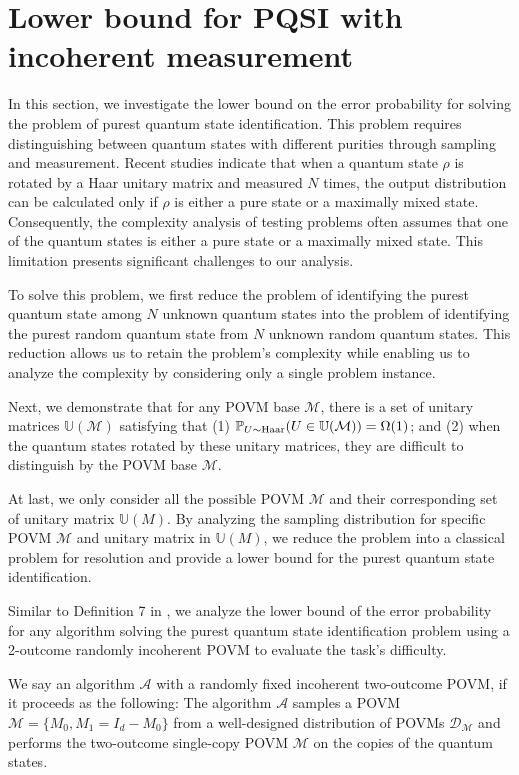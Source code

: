 \section{Lower bound for PQSI with incoherent measurement}
\label{sec: lower_bound}


In this section, we investigate the lower bound on the error probability for solving the problem of purest quantum state identification. This problem requires distinguishing between quantum states with different purities through sampling and measurement. Recent studies \cite{mele2024introduction} indicate that when a quantum state $\rho$ is rotated by a Haar unitary matrix and measured $N$ times, the output distribution can be calculated only if $\rho$ is either a pure state or a maximally mixed state. Consequently, the complexity analysis of testing problems often assumes that one of the quantum states is either a pure state or a maximally mixed state. This limitation presents significant challenges to our analysis.

To solve this problem, we first reduce the problem of identifying the purest quantum state among $ N $ unknown quantum states into the problem of identifying the purest random quantum state from $ N $ unknown random quantum states. This reduction allows us to retain the problem's complexity while enabling us to analyze the complexity by considering only a single problem instance. 

Next, we demonstrate that for any POVM base $\mathcal{M}$, there is a set of unitary matrices $\mathbb{U}(\mathcal{M})$ satisfying that (1) $\mathbb{P}_{U \sim \mathrm{Haar}} (U \in \mathbb{U}(\mathcal{M})) = \Omega(1)$; and (2) when the quantum states rotated by these unitary matrices, they are difficult to distinguish by the POVM base  $\mathcal{M}$.

At last, we only consider all the possible POVM $\mathcal{M}$ and their corresponding set of unitary matrix $\mathbb{U}(M)$. By analyzing the sampling distribution for specific POVM $\mathcal{M}$ and unitary matrix in $\mathbb{U}(M)$, we reduce the problem into a classical problem for resolution and provide a lower bound for the purest quantum state identification.

Similar to Definition 7 in \cite{gong2024sample}, we analyze the lower bound of the error probability for any algorithm solving the purest quantum state identification problem using a 2-outcome randomly incoherent POVM to evaluate the task's difficulty.

\begin{definition} We say an algorithm $\mathcal{A}$ with a randomly fixed incoherent two-outcome POVM, if it proceeds as the following:  The algorithm $\mathcal{A}$ samples a POVM $\mathcal{M} = \{M_0, M_1 = I_d -M_0\}$ from a well-designed distribution of POVMs $\mathcal{D}_{\mathcal{M}}$ and performs the two-outcome single-copy POVM $\mathcal{M}$ on the copies of the quantum states.
\end{definition}




